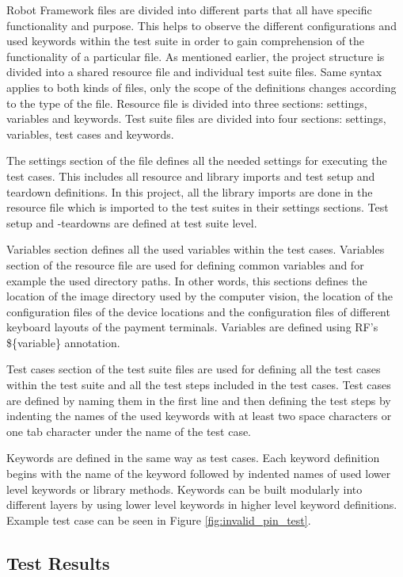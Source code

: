 Robot Framework files are divided into different parts that all have specific functionality and purpose. This helps to observe the different configurations and used keywords within the test suite in order to gain comprehension of the functionality of a particular file. As mentioned earlier, the project structure is divided into a shared resource file and individual test suite files. Same syntax applies to both kinds of files, only the scope of the definitions changes according to the type of the file. Resource file is divided into three sections: settings, variables and keywords. Test suite files are divided into four sections: settings, variables, test cases and keywords.

The settings section of the file defines all the needed settings for executing the test cases. This includes all resource and library imports and test setup and teardown definitions. In this project, all the library imports are done in the resource file which is imported to the test suites in their settings sections. Test setup and -teardowns are defined at test suite level.

Variables section defines all the used variables within the test cases. Variables section of the resource file are used for defining common variables and for example the used directory paths. In other words, this sections defines the location of the image directory used by the computer vision, the location of the configuration files of the device locations and the configuration files of different keyboard layouts of the payment terminals. Variables are defined using RF's \$\{variable\} annotation.

Test cases section of the test suite files are used for defining all the test cases within the test suite and all the test steps included in the test cases. Test cases are defined by naming them in the first line and then defining the test steps by indenting the names of the used keywords with at least two space characters or one tab character under the name of the test case.
    
Keywords are defined in the same way as test cases. Each keyword definition begins with the name of the keyword followed by indented names of used lower level keywords or library methods. Keywords can be built modularly into different layers by using lower level keywords in higher level keyword definitions. Example test case can be seen in Figure \ref{fig:invalid_pin_test}.

\subsection{Test Results}
\label{subsection:Test result syntax}

